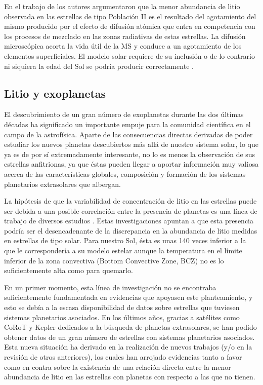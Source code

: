 En el trabajo de \cite{Richard2004} los autores argumentaron que la menor abundancia de litio observada en las estrellas de tipo Población II es el resultado del agotamiento del mismo producido por el efecto de difusión atómica que entra en competencia con los procesos de mezclado en las zonas radiativas de estas estrellas. La difusión microscópica acorta la vida útil de la MS y conduce a un agotamiento de los elementos superficiales. El modelo solar requiere de su inclusión o de lo contrario ni siquiera la edad del Sol se podría producir correctamente \citep{Thoul1993}.\par

\subsection{Litio y exoplanetas} \label{sec:litio_exoplanetas}
El descubrimiento de un gran número de exoplanetas durante las dos últimas décadas \citep{Wolszczan1992, Mayor1995, Bonfils2018} ha significado un importante empuje para la comunidad científica en el campo de la astrofísica. Aparte de las consecuencias directas derivadas de poder estudiar los nuevos planetas descubiertos más allá de nuestro sistema solar, lo que ya es de por sí extremadamente interesante, no lo es menos la observación de sus estrellas anfitrionas, ya que éstas pueden llegar a aportar información muy valiosa acerca de las características globales, composición y formación de los sistemas planetarios extrasolares que albergan.\par

La hipótesis de que la variabilidad de concentración de litio en las estrellas puede ser debida a una posible correlación entre la presencia de planetas es una línea de trabajo de diversos estudios \citep{Israelian2009, DelgadoMena2014, Figueira2014, Mishenina2016}. Estas investigaciones apuntan a que esta presencia podría ser el desencadenante de la discrepancia en la abundancia de litio medidas en estrellas de tipo solar. Para nuestro Sol, ésta es unas 140 veces inferior a la que le correspondería a su modelo estelar \citep{Israelian2009} aunque la temperatura en el límite inferior de la zona convectiva (Bottom Convective Zone, BCZ) no es lo suficientemente alta como para quemarlo.\par

En un primer momento, esta línea de investigación no se encontraba suficientemente fundamentada en evidencias que apoyasen este planteamiento, y esto se debía a la escasa disponibilidad de datos sobre estrellas que tuviesen sistemas planetarios asociados. En los últimos años, gracias a satélites como CoRoT \citep{Baglin2006} y Kepler \citep{Borucki2010} dedicados a la búsqueda de planetas extrasolares, se han podido obtener datos de un gran número de estrellas con sistemas planetarios asociados. Esta nueva situación ha derivado en la realización de nuevos trabajos (y/o en la revisión de otros anteriores), los cuales  han arrojado evidencias tanto a favor \citep{Bouvier2008, Israelian2009} como en contra \citep{Baumann2010} sobre la existencia de una relación directa entre la menor abundancia de litio en las estrellas con planetas con respecto a las que no tienen.\par

